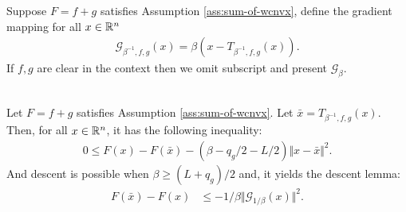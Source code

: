 \documentclass[12pt]{report}
\begin{document}
            \begin{definition}\label{def:gm-for-ch2}
                Suppose $F = f + g$ satisfies Assumption \ref{ass:sum-of-wcnvx}, define the gradient mapping for all $x \in \mathbb R^n$
                \begin{align*}
                    \mathcal G_{\beta^{-1}, f, g}(x) = \beta(x - T_{\beta^{-1}, f, g}(x)). 
                \end{align*}
                If $f, g$ are clear in the context then we omit subscript and present $\mathcal G_\beta$. 
            \end{definition}
            \begin{lemma}\;\label{lemma:mono-wcnvx-descent}\\
                Let $F = f + g$ satisfies Assumption \ref{ass:sum-of-wcnvx}. 
                Let $\bar x = T_{\beta^{-1}, f, g}(x)$. 
                Then, for all $x \in \mathbb R^n$, it has the following inequality: 
                $$
                \begin{aligned}
                    0 \le F(x) - F(\bar x) - (\beta - q_g/2 - L/2)\Vert x - \bar x\Vert^2. 
                \end{aligned}
                $$
                And descent is possible when $\beta \ge (L + q_g)/2$ and, it yields the descent lemma: 
                \begin{align*}
                    F(\bar x) - F(x) &\le - 1/\beta \Vert \mathcal G_{1/\beta}(x)\Vert^2. 
                \end{align*}
            \end{lemma}
\end{document}
